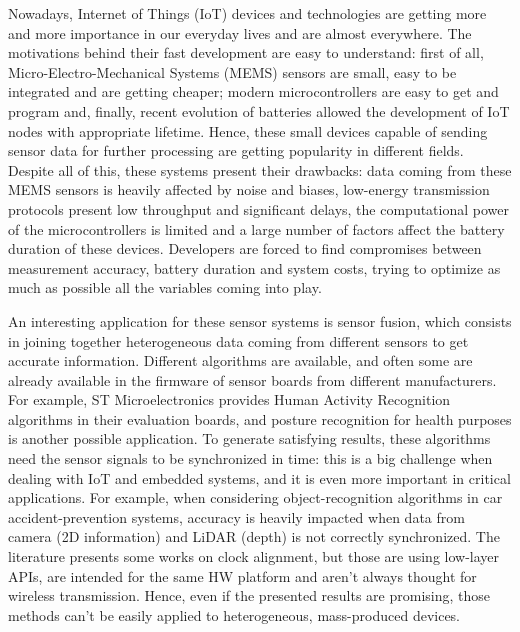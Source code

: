 Nowadays, Internet of Things (IoT) devices and technologies are getting more and more importance in our everyday lives and are almost everywhere. 
The motivations behind their fast development are easy to understand: 
first of all, Micro-Electro-Mechanical Systems (MEMS) sensors are small, easy to be integrated and are getting cheaper; 
modern microcontrollers are easy to get and program and, 
finally, recent evolution of batteries allowed the development of IoT nodes with appropriate lifetime. 
Hence, these small devices capable of sending sensor data for further processing are getting popularity in different fields. 
Despite all of this, these systems present their drawbacks: data coming from these MEMS sensors is heavily affected by noise and biases, low-energy transmission protocols present low throughput and significant delays, the computational power of the microcontrollers is limited and a large number of factors affect the battery duration of these devices.
Developers are forced to find compromises between measurement accuracy, battery duration and system costs, trying to optimize as much as possible all the variables coming into play. 

An interesting application for these sensor systems is sensor fusion, which consists in joining together heterogeneous data coming from different sensors to get accurate information. 
Different algorithms are available, and often some are already available in the firmware of sensor boards from different manufacturers. 
For example, ST Microelectronics provides Human Activity Recognition algorithms in their evaluation boards, and posture recognition for health purposes is another possible application. 
To generate satisfying results, these algorithms need the sensor signals to be synchronized in time: this is a big challenge when dealing with IoT and embedded systems, and it is even more important in critical applications. 
For example, when considering object-recognition algorithms in car accident-prevention systems, accuracy is heavily impacted when data from camera (2D information) and LiDAR (depth) is not correctly synchronized. 
The literature presents some works on clock alignment, but those are using low-layer APIs, are intended for the same HW platform and aren't always thought for wireless transmission. Hence, even if the presented results are promising, those methods can’t be easily applied to heterogeneous, mass-produced devices. 

